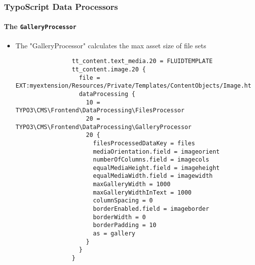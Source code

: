\begin{frame}[fragile]
	\frametitle{TypoScript Data Processors}
	\framesubtitle{The \texttt{GalleryProcessor}}

	\lstset{basicstyle=\tiny\ttfamily}

	\begin{itemize}


		\item The "GalleryProcessor" calculates the max asset size of file sets

			\begin{lstlisting}
				tt_content.text_media.20 = FLUIDTEMPLATE
				tt_content.image.20 {
				  file = EXT:myextension/Resources/Private/Templates/ContentObjects/Image.html
				  dataProcessing {
				    10 = TYPO3\CMS\Frontend\DataProcessing\FilesProcessor
				    20 = TYPO3\CMS\Frontend\DataProcessing\GalleryProcessor
				    20 {
				      filesProcessedDataKey = files
				      mediaOrientation.field = imageorient
				      numberOfColumns.field = imagecols
				      equalMediaHeight.field = imageheight
				      equalMediaWidth.field = imagewidth
				      maxGalleryWidth = 1000
				      maxGalleryWidthInText = 1000
				      columnSpacing = 0
				      borderEnabled.field = imageborder
				      borderWidth = 0
				      borderPadding = 10
				      as = gallery
				    }
				  }
				}
			\end{lstlisting}

	\end{itemize}

\end{frame}


